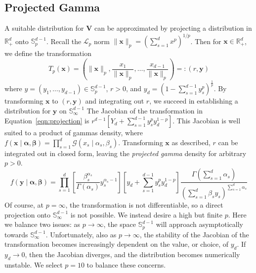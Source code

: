 \subsection{Projected Gamma\label{ref:pg}}

A suitable distribution for $\bm{V}$ can be approximated by projecting a 
    distribution in $\mathbb{R}_+^d$ onto $\mathbb{S}_{p}^{d-1}$.  
    Recall the $\mathcal{L}_p$ norm 
    $\lVert \bm{x}\rVert_p = \left(\sum_{s = 1}^dx^p\right)^{1/p}$.  Then
    for $\bm{x}\in\mathbb{R}_+^d$, we define the transformation
    \begin{equation}
        \label{eqn:projection}
        T_p(\bm{x}) = \left(\lVert \bm{x}\rVert_p, 
            \frac{x_1}{\lVert \bm{x}\rVert_p},\ldots, 
                \frac{x_{d-1}}{\lVert \bm{x}\rVert_p}\right)
                =: (r,\bm{y})
    \end{equation}
    where $y = (y_1,\ldots,y_{d-1}) \in \mathbb{S}_{p}^{d-1}$, $r > 0$, and 
    $y_d = (1 - \sum_{s = 1}^{d-1}y_{s}^p)^{\frac{1}{p}}$.
    By transforming $\bm{x}$ to $(r,\bm{y})$ and integrating out $r$, we
    succeed in establishing a distribution for $\bm{y}$ on 
    $\mathbb{S}_{\infty}^{d-1}$
    The Jacobian of the transformation in Equation~\eqref{eqn:projection} is
    $r^{d-1}[Y_d + \sum_{s = 1}^{d-1}y_{s}^py_d^{1-p}]$.
    This Jacobian is well suited to a product of gammas density, where 
    $f(\bm{x}\mid\bm{\alpha},\bm{\beta}) = 
        \prod_{s = 1}^d\mathcal{G}(x_{s}\mid\alpha_{s},\beta_{s})$.
    Transforming $\bm{x}$ as described, $r$ can be integrated out in closed
    form, leaving the \emph{projected gamma} density for arbitrary $p > 0$.
    \[
        f(\bm{y}\mid\bm{\alpha},\bm{\beta}) = \prod_{s = 1}^d\left[
            \frac{\beta_{s}^{\alpha_{s}}}{\Gamma(\alpha_{s})}
            y_{s}^{\alpha_{s} - 1}\right]
            \left[y_d + \sum_{s = 1}^{d-1}y_{s}^py_d^{1-p}\right]
            \frac{\Gamma(\sum_{s = 1}^d \alpha_{s})}{\left(
                \sum_{s = 1}^d\beta_{s}y_{s}
                \right)^{\sum_{s = 1}^d \alpha_{s}}
            }
    \]
    Of course, at $p=\infty$, the transformation is not differentiable, so a 
    direct projection onto $\mathbb{S}_{\infty}^{d-1}$ is not possible. We
    instead desire a high but finite $p$.
    Here we balance two issues: as $p\to\infty$, the space $\mathbb{S}_{p}^{d-1}$ 
    will approach asymptotically towards $\mathbb{S}_{\infty}^{d-1}$.
    Unfortunately, also as $p\to\infty$, the stability of the Jacobian of the
    transformation becomes increasingly dependent on the value, or choice, of 
    $y_d$.  If $y_d\to 0$, then the Jacobian diverges, and the distribution 
    becomes numerically unstable. We select $p = 10$ to balance these concerns.

